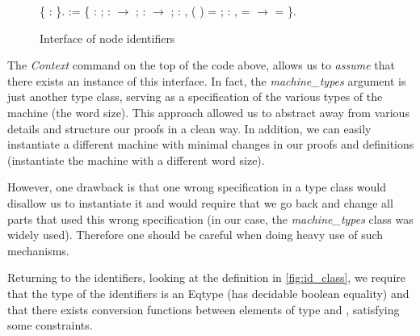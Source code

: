 \begin{figure}[!htpb] 
\begin{coqdoccode}
  \coqdocnoindent {} \{ :
  \}.\coqdoceol \coqdocemptyline
  \coqdocnoindent {}  := \{\coqdoceol
  \coqdocindent{1.00em}  : ;\coqdoceol
  \coqdocnoindent \coqdoceol \coqdocindent{1.00em}
   :  
  \ensuremath{\rightarrow} 
  ;\coqdoceol \coqdocindent{1.00em}
   :  \ensuremath{\rightarrow}
   ;\coqdoceol \coqdocindent{1.00em}
  \coqdoceol \coqdocindent{1.00em}  :
  \coqdockw{\ensuremath{\forall}} ,
   ( ) =
   ;\coqdoceol \coqdocindent{1.00em}
   : \coqdockw{\ensuremath{\forall}}
   ,  
  =   \ensuremath{\rightarrow}
    = \coqdoceol
  \coqdocindent{14.50em} \coqdoceol \coqdocnoindent \}.\coqdoceol
\end{coqdoccode}
\caption{Interface of node identifiers}
\label{fig:cfi_id}
\end{figure}

The \emph{Context} command on the top of the code above, allows us to
\textit{assume} that there exists an instance of this interface.
In fact, the \emph{machine\_types} argument is just another type class,
serving as a specification of the various types of the machine (\EG the word 
size). This approach allowed us to abstract away from various details and
structure our proofs in a clean way.
In addition, we can easily instantiate a different machine with minimal changes
in our proofs and definitions (\EG instantiate the machine with a different word
size).

However, one drawback is that one wrong specification in a type class would
disallow us to instantiate it and would require that we go back and change
all parts that used this wrong specification (\EG in our case, the 
\emph{machine\_types} class was widely used). Therefore one should be careful
when doing heavy use of such mechanisms.

Returning to the identifiers, looking at the definition in \ref{fig:id_class},
we require that the type of the identifiers \id is an Eqtype (has decidable
boolean equality) and that there exists conversion functions between elements
of type \word and \id, satisfying some constraints. 


